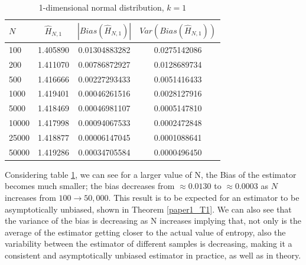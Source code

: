 \documentclass{article}
\begin{document}
\begin{table}
\caption{1-dimensional normal distribution, $k=1$} \label{normal_k=1_table}
\begin{center}
\begin{tabular}{| l | c c c|} 
\toprule
$N$ & $\hat{H}_{N, 1}$ & $|Bias(\hat{H}_{N, 1})|$ & $Var(Bias(\hat{H}_{N, 1}))$ \\
\midrule[1pt]
100     & 1.405890     & 0.01304883282     & 0.0275142086  \\
200     & 1.411070     & 0.00786872927     & 0.0128689734  \\
500     & 1.416666     & 0.00227293433     & 0.0051416433  \\
1000    & 1.419401     & 0.00046261516     & 0.0028127916  \\
5000    & 1.418469     & 0.00046981107     & 0.0005147810  \\
10000   & 1.417998     & 0.00094067533     & 0.0002472848  \\
25000   & 1.418877     & 0.00006147045     & 0.0001088641  \\
50000   & 1.419286     & 0.00034705584     & 0.0000496450  \\
\hline
\end{tabular}
\end{center}
\end{table}

Considering table \ref{normal_k=1_table}, we can see for a larger value of N, the Bias of the estimator becomes much smaller; the bias decreases from $\approx 0.0130$ to $\approx 0.0003$ as $N$ increases from $100 \to 50,000$. This result is to be expected for an estimator to be asymptotically unbiased, shown in Theorem \ref{paper1_T1}. We can also see that the variance of the bias is decreasing as N increases implying that, not only is the average of the estimator getting closer to the actual value of entropy, also the variability between the estimator of different samples is decreasing, making it a consistent and asymptotically unbiased estimator in practice, as well as in theory.
\end{document}
